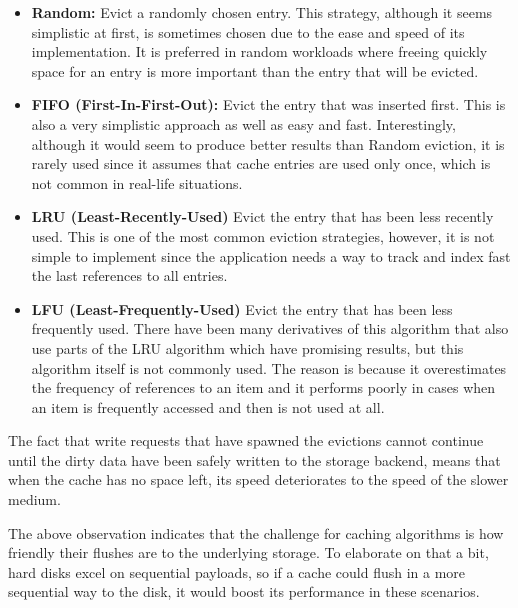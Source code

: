 %
\begin{itemize}
	\item \textbf{Random:} Evict a randomly chosen entry. This strategy, 
		although it seems simplistic at first, is sometimes chosen due 
		to the ease and speed of its implementation. It is preferred in 
		random workloads where freeing quickly space for an entry is 
		more important than the entry that will be evicted.
	\item \textbf{FIFO (First-In-First-Out):} Evict the entry that was 
		inserted first. This is also a very simplistic approach as well 
		as easy and fast.  Interestingly, although it would seem to 
		produce better results than Random eviction, it is rarely used 
		since it assumes that cache entries are used only once, which 
		is not common in real-life situations.
	\item \textbf{LRU (Least-Recently-Used)}
		Evict the entry that has been less recently used. This is one 
		of the most common eviction strategies, however, it is not 
		simple to implement since the application needs a way to track 
		and index fast the last references to all entries.
	\item \textbf{LFU (Least-Frequently-Used)}
		Evict the entry that has been less frequently used. There have 
		been many derivatives of this algorithm that also use parts of 
		the LRU algorithm which have promising results, but this 
		algorithm itself is not commonly used. The reason is because it 
		overestimates the frequency of references to an item and it 
		performs poorly in cases when an item is frequently accessed 
		and then is not used at all.
\end{itemize}


The fact that write requests that have spawned the evictions cannot continue 
until the dirty data have been safely written to the storage backend, means 
that when the cache has no space left, its speed deteriorates to the speed of 
the slower medium.

The above observation indicates that the challenge for caching algorithms is 
how friendly their flushes are to the underlying storage. To elaborate on that 
a bit, hard disks excel on sequential payloads, so if a cache could flush in a 
more sequential way to the disk, it would boost its performance in these 
scenarios.

